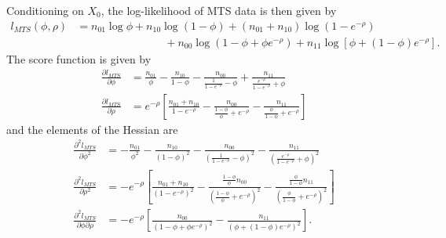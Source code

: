 \documentclass[11pt]{article}
\begin{document}
Conditioning on $X_0$, the log-likelihood of MTS data is then given by \begin{equation}
\begin{aligned}
\label{eq:MTS_loglik}
l_{MTS}(\phi, \rho) &= n_{01} \log \phi + n_{10} \log\left(1 - \phi\right) + \left(n_{01} + n_{10}\right) \log \left(1 - e^{-\rho}\right) \\
& \qquad \qquad \qquad \qquad + n_{00} \log\left(1 - \phi + \phi e^{-\rho}\right) + n_{11}\log\left[\phi + (1 - \phi) e^{-\rho}\right].
\end{aligned}
\end{equation}
The score function is given by 
\begin{align*}
\frac{\partial l_{MTS}}{\partial \phi} &= \frac{n_{01}}{\phi} - \frac{n_{10}}{1 - \phi} - \frac{n_{00}}{\frac{1}{1 - e^{-\rho}} - \phi} + \frac{n_{11}}{\frac{e^{-\rho}}{1 - e^{-\rho}} + \phi} \\
\frac{\partial l_{MTS}}{\partial \rho} &= e^{-\rho}\left[\frac{n_{01} + n_{10}}{1 - e^{-\rho}} - \frac{n_{00}}{\frac{1 - \phi}{\phi} + e^{-\rho}} - \frac{n_{11}}{\frac{\phi}{1 - \phi} + e^{-\rho}} \right] 
\end{align*}
and the elements of the Hessian are
\begin{align*}
\frac{\partial^2 l_{MTS}}{\partial \phi^2} &= -\frac{n_{01}}{\phi^2} - \frac{n_{10}}{(1 - \phi)^2} - \frac{n_{00}}{\left(\frac{1}{1 - e^{-\rho}} - \phi\right)^2} - \frac{n_{11}}{\left(\frac{e^{-\rho}}{1 - e^{-\rho}} + \phi\right)^2} \\
\frac{\partial^2 l_{MTS}}{\partial \rho^2} &= -e^{-\rho}\left[\frac{n_{01} + n_{10}}{\left(1 - e^{-\rho}\right)^2} - \frac{\frac{1 - \phi}{\phi}n_{00}}{\left(\frac{1 - \phi}{\phi} + e^{-\rho}\right)^2} - \frac{\frac{\phi}{1 - \phi}n_{11}}{\left(\frac{\phi}{1 - \phi} + e^{-\rho}\right)^2} \right] \\
\frac{\partial^2 l_{MTS}}{\partial \phi \partial \rho} &= -e^{-\rho}\left[\frac{n_{00}}{\left(1 - \phi + \phi e^{-\rho}\right)^2} - \frac{n_{11}}{\left(\phi + (1 - \phi) e^{-\rho}\right)^2} \right]. \\
\end{align*}
\end{document}
